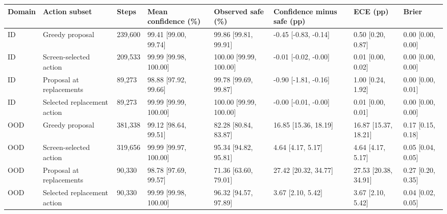 \begin{tabular}{llllllll}
\toprule
Domain & Action subset & Steps & Mean confidence (\%) & Observed safe (\%) & Confidence minus safe (pp) & ECE (pp) & Brier \\
\midrule
ID & Greedy proposal & 239,600 & 99.41 [99.00, 99.74] & 99.86 [99.81, 99.91] & -0.45 [-0.83, -0.14] & 0.50 [0.20, 0.87] & 0.00 [0.00, 0.00] \\
ID & Screen-selected action & 209,533 & 99.99 [99.98, 100.00] & 100.00 [99.99, 100.00] & -0.01 [-0.02, -0.00] & 0.01 [0.00, 0.02] & 0.00 [0.00, 0.00] \\
ID & Proposal at replacements & 89,273 & 98.88 [97.92, 99.66] & 99.78 [99.69, 99.87] & -0.90 [-1.81, -0.16] & 1.00 [0.24, 1.92] & 0.00 [0.00, 0.01] \\
ID & Selected replacement action & 89,273 & 99.99 [99.99, 100.00] & 100.00 [99.99, 100.00] & -0.00 [-0.01, -0.00] & 0.01 [0.00, 0.01] & 0.00 [0.00, 0.00] \\
OOD & Greedy proposal & 381,338 & 99.12 [98.64, 99.51] & 82.28 [80.84, 83.87] & 16.85 [15.36, 18.19] & 16.87 [15.37, 18.21] & 0.17 [0.15, 0.18] \\
OOD & Screen-selected action & 319,656 & 99.99 [99.97, 100.00] & 95.34 [94.82, 95.81] & 4.64 [4.17, 5.17] & 4.64 [4.17, 5.17] & 0.05 [0.04, 0.05] \\
OOD & Proposal at replacements & 90,330 & 98.78 [97.69, 99.57] & 71.36 [63.60, 79.01] & 27.42 [20.32, 34.77] & 27.53 [20.38, 34.91] & 0.27 [0.20, 0.35] \\
OOD & Selected replacement action & 90,330 & 99.99 [99.98, 100.00] & 96.32 [94.57, 97.89] & 3.67 [2.10, 5.42] & 3.67 [2.10, 5.42] & 0.04 [0.02, 0.05] \\
\bottomrule
\end{tabular}
